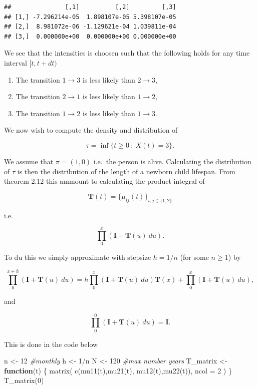 \documentclass[a4paper,12pt,openany]{book}
\newenvironment{Shaded}{\begin{snugshade}}{\end{snugshade}}
\newcommand{\AttributeTok}[1]{\textcolor[rgb]{0.77,0.63,0.00}{#1}}
\newcommand{\CommentTok}[1]{\textcolor[rgb]{0.56,0.35,0.01}{\textit{#1}}}
\newcommand{\ControlFlowTok}[1]{\textcolor[rgb]{0.13,0.29,0.53}{\textbf{#1}}}
\newcommand{\DecValTok}[1]{\textcolor[rgb]{0.00,0.00,0.81}{#1}}
\newcommand{\FunctionTok}[1]{\textcolor[rgb]{0.00,0.00,0.00}{#1}}
\newcommand{\NormalTok}[1]{#1}
\newcommand{\OtherTok}[1]{\textcolor[rgb]{0.56,0.35,0.01}{#1}}
\newcommand{\SpecialCharTok}[1]{\textcolor[rgb]{0.00,0.00,0.00}{#1}}
\providecommand{\tightlist}{%
 \setlength{\itemsep}{0pt}\setlength{\parskip}{0pt}}
\begin{document}
\begin{verbatim}
##               [,1]          [,2]         [,3]
## [1,] -7.296214e-05  1.898107e-05 5.398107e-05
## [2,]  8.981072e-06 -1.129621e-04 1.039811e-04
## [3,]  0.000000e+00  0.000000e+00 0.000000e+00
\end{verbatim}

We see that the intensities is choosen such that the following holds for any time interval \([t,t+dt)\)

\begin{enumerate}
\def\labelenumi{\arabic{enumi}.}
\tightlist
\item
  The transition \(1\to 3\) is less likely than \(2\to 3\),
\item
  The transition \(2\to 1\) is less likely than \(1\to 2\),
\item
  The transition \(1\to 2\) is less likely than \(1\to 3\).
\end{enumerate}

We now wish to compute the density and distribution of

\[
\tau =\inf\{t\ge 0\ :\ X(t)=3\}.
\]

We assume that \(\pi=(1,0)\) i.e.~the person is alive. Calculating the distribution of \(\tau\) is then the distribution of the length of a newborn child lifespan. From theorem 2.12 this ammount to calculating the product integral of

\[
\mathbf{T}(t)=\{\mu_{ij}(t)\}_{i,j\in \{1,2\}}
\]

i.e.~

\[
\prod_0^x(\mathbf{I}+\mathbf{T}(u)\ du).
\]

To du this we simply approximate with stepsize \(h=1/n\) (for some \(n\ge 1\)) by

\[
\prod_0^{x+h}(\mathbf{I}+\mathbf{T}(u)\ du)=h\prod_0^x(\mathbf{I}+\mathbf{T}(u)\ du)\mathbf{T}(x)+\prod_0^x(\mathbf{I}+\mathbf{T}(u)\ du),
\]

and

\[
\prod_0^0(\mathbf{I}+\mathbf{T}(u)\ du)=\mathbf{I}.
\]

This is done in the code below

\begin{Shaded}
\begin{Highlighting}[]
\NormalTok{n }\OtherTok{\textless{}{-}} \DecValTok{12} \CommentTok{\#monthly}
\NormalTok{h }\OtherTok{\textless{}{-}} \DecValTok{1}\SpecialCharTok{/}\NormalTok{n}
\NormalTok{N }\OtherTok{\textless{}{-}} \DecValTok{120} \CommentTok{\#max number years}
\NormalTok{T\_matrix }\OtherTok{\textless{}{-}} \ControlFlowTok{function}\NormalTok{(t) \{}
  \FunctionTok{matrix}\NormalTok{(}
    \FunctionTok{c}\NormalTok{(}\FunctionTok{mu11}\NormalTok{(t),}\FunctionTok{mu21}\NormalTok{(t),}
      \FunctionTok{mu12}\NormalTok{(t),}\FunctionTok{mu22}\NormalTok{(t)),}
    \AttributeTok{ncol =} \DecValTok{2}
\NormalTok{  )}
\NormalTok{\}}
\FunctionTok{T\_matrix}\NormalTok{(}\DecValTok{0}\NormalTok{)}
\end{Highlighting}
\end{Shaded}
\end{document}
